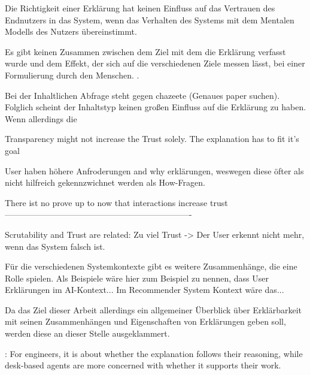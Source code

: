 Die Richtigkeit einer Erklärung hat keinen Einfluss auf das Vertrauen des Endnutzers in das System, wenn das Verhalten des Systems mit dem Mentalen Modells des Nutzers übereinstimmt. \cite{eiband_impact_2019, riveiro_thats_2021}

Es gibt keinen Zusammen zwischen dem Ziel mit dem die Erklärung verfasst wurde und dem Effekt, der sich auf die verschiedenen Ziele messen lässt, bei einer Formulierung durch den Menschen. \cite{balog_measuring_2020}.

Bei der Inhaltlichen Abfrage steht \cite{zahedi_towards_2019} gegen chazeete (Genaues paper suchen). Folglich scheint der Inhaltstyp keinen großen Einfluss auf die Erklärung zu haben. Wenn allerdings die 

Transparency might not increase the Trust solely. The explanation has to fit it's goal \cite{wiegand2019drive}

User haben höhere Anfroderungen and why erklärungen, weswegen diese öfter als nicht hilfreich gekennzwichnet werden als How-Fragen. \cite{lim_2009_assessing}

There ist no prove up to now that interactions increase trust \cite{cheng2019explaining}
-------------------------------------------------------------------

Scrutability and Trust are related: Zu viel Trust -> Der User erkennt nicht mehr, wenn das System falsch ist. \cite{gunning2019darpa}

Für die verschiedenen Systemkontexte gibt es weitere Zusammenhänge, die eine Rolle spielen. Als Beispiele wäre hier zum Beispiel zu nennen, dass User Erklärungen im AI-Kontext... Im Recommender System Kontext wäre das...

Da das Ziel dieser Arbeit allerdings ein allgemeiner Überblick über Erklärbarkeit mit seinen Zusammenhängen und Eigenschaften von Erklärungen geben soll, werden diese an dieser Stelle ausgeklammert.

\cite{martin_evaluating_2021}: For engineers, it is about whether the explanation follows their reasoning, while desk-based agents are more concerned with whether it supports their work.
